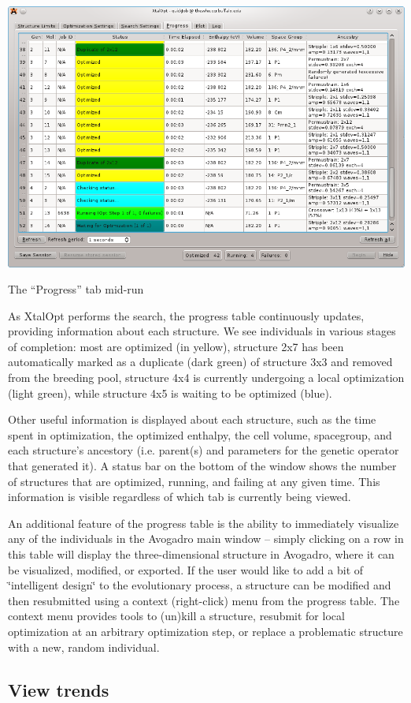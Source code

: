 \begin{DoxyImage}
\includegraphics[width=\textwidth]{prog-mon.png}
\caption{The ``\-Progress'' tab mid-\/run}
\end{DoxyImage}


As Xtal\-Opt performs the search, the progress table continuously updates, providing information about each structure. We see individuals in various stages of completion\-: most are optimized (in yellow), structure 2x7 has been automatically marked as a duplicate (dark green) of structure 3x3 and removed from the breeding pool, structure 4x4 is currently undergoing a local optimization (light green), while structure 4x5 is waiting to be optimized (blue).

Other useful information is displayed about each structure, such as the time spent in optimization, the optimized enthalpy, the cell volume, spacegroup, and each structure's ancestory (i.\-e. parent(s) and parameters for the genetic operator that generated it). A status bar on the bottom of the window shows the number of structures that are optimized, running, and failing at any given time. This information is visible regardless of which tab is currently being viewed.

An additional feature of the progress table is the ability to immediately visualize any of the individuals in the Avogadro main window -- simply clicking on a row in this table will display the three-\/dimensional structure in Avogadro, where it can be visualized, modified, or exported. If the user would like to add a bit of \char`\"{}intelligent design\char`\"{} to the evolutionary process, a structure can be modified and then resubmitted using a context (right-\/click) menu from the progress table. The context menu provides tools to (un)kill a structure, resubmit for local optimization at an arbitrary optimization step, or replace a problematic structure with a new, random individual.\hypertarget{tut-xo_trends}{}\subsection{View trends}\label{tut-xo_trends}

